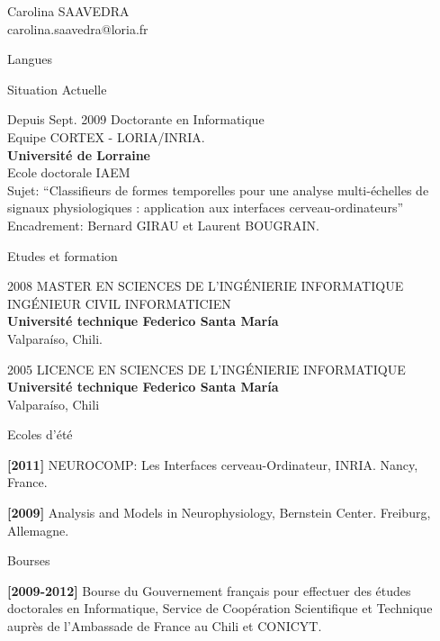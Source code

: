\documentclass[letterpaper]{article}
\begin{document}
\begin{cv}{{\huge Carolina SAAVEDRA}\\
carolina.saavedra@loria.fr}
\begin{cvlist}{Langues}
\end{cvlist}

\begin{cvlist}{Situation Actuelle}
\item[Depuis Sept. 2009] Doctorante en Informatique\\
  Equipe CORTEX - LORIA/INRIA.\\
  \textbf{Université de Lorraine}\\
  Ecole doctorale IAEM\\
  Sujet: ``Classifieurs de formes temporelles pour une analyse multi-échelles de signaux physiologiques : application aux interfaces cerveau-ordinateurs''\\
  Encadrement: Bernard GIRAU et Laurent BOUGRAIN.
 
\end{cvlist}


\begin{cvlist}{Etudes et formation}
\item[2008] MASTER EN SCIENCES DE L'INGÉNIERIE INFORMATIQUE\\
	  INGÉNIEUR CIVIL INFORMATICIEN\\
        \textbf{Université technique Federico Santa María}\\
	Valparaíso, Chili.

\item[2005] LICENCE EN SCIENCES DE L'INGÉNIERIE
INFORMATIQUE\\
        \textbf{Université technique Federico Santa María}\\
	Valparaíso, Chili


\item[Ecoles d'été]

\textbf{[2011]} NEUROCOMP: Les Interfaces cerveau-Ordinateur, INRIA. Nancy, France.

\textbf{[2009]} Analysis and Models in Neurophysiology, Bernstein Center. Freiburg, Allemagne.

% 

\item[Bourses]

\textbf{[2009-2012]} Bourse du Gouvernement français pour effectuer des études doctorales en Informatique,
 Service de Coopération Scientifique et Technique auprès de l’Ambassade de France au Chili et CONICYT.



\end{cvlist}
\end{cv}
\end{document}
